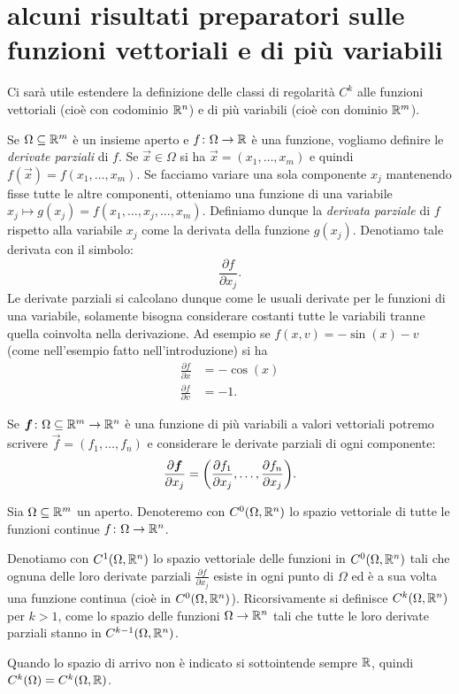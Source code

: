 \section[funzioni vettoriali e di più variabili]{alcuni risultati preparatori
sulle funzioni vettoriali e di più variabili}

Ci sarà utile estendere la definizione delle classi di regolarità $C^k$ alle
funzioni vettoriali (cioè con codominio $\mathbb R^n$) e di più variabili
(cioè con dominio $\mathbb R^m$).

Se $\Omega\subseteq \mathbb R^m$ è un insieme aperto e $f\colon \Omega \to \mathbb R$
è una funzione, vogliamo definire le \emph{derivate parziali} di $f$.
Se $\vec x \in \Omega$ si ha $\vec x = (x_1,\dots, x_m)$ e quindi
$f(\vec x) = f(x_1,\dots, x_m)$. Se facciamo variare una sola componente
$x_j$ mantenendo fisse tutte le altre componenti, otteniamo una funzione
di una variabile $x_j \mapsto g(x_j) = f(x_1,\dots, x_j, \dots, x_m)$.
Definiamo dunque la \emph{derivata parziale}
di $f$ rispetto alla variabile $x_j$ come la derivata della funzione $g(x_j)$.
Denotiamo tale derivata con il simbolo:
\[
  \frac{\partial f}{\partial x_j}.
\]
Le derivate parziali si calcolano dunque come le usuali derivate per le
funzioni di una variabile, solamente bisogna considerare costanti tutte
le variabili tranne quella coinvolta nella derivazione.
Ad esempio se $f(x,v) = -\sin(x) - v$
(come nell'esempio fatto nell'introduzione) si ha
\begin{align*}
  \frac{\partial f}{\partial x} &= -\cos(x)\\
  \frac{\partial f}{\partial v} &= -1.
\end{align*}

Se $\boldsymbol f\colon \Omega \subseteq \mathbb R^m \to \mathbb R^n$ è una funzione di più
variabili a valori vettoriali potremo scrivere $\vec f = (f_1, \dots, f_n)$
e considerare le derivate parziali di ogni componente:
\[
  \frac{\partial \boldsymbol f}{\partial x_j}
  = {\left( \frac{\partial f_1}{\partial x_j}, \dots, \frac{\partial f_n}{\partial x_j} \right)}.
\]

\begin{definition}
Sia $\Omega\subseteq \mathbb R^m$ un aperto. Denoteremo con $C^0(\Omega,\mathbb R^n)$
lo spazio vettoriale di tutte le funzioni
continue $f\colon \Omega \to \mathbb R^n$.

Denotiamo con $C^1(\Omega,\mathbb R^n)$ lo spazio vettoriale
delle funzioni in $C^0(\Omega,\mathbb R^n)$ tali che ognuna delle loro derivate
parziali $\frac{\partial f}{\partial x_j}$ esiste in ogni punto di $\Omega$ ed
è a sua volta una funzione continua (cioè in $C^0(\Omega,\mathbb R^n)$).
Ricorsivamente si definisce $C^k(\Omega,\mathbb R^n)$ per $k>1$,
come lo spazio delle funzioni $\Omega\to\mathbb R^n$ tali che tutte le loro derivate
parziali stanno in $C^{k-1}(\Omega,\mathbb R^n)$.

Quando lo spazio di arrivo non è indicato si sottointende sempre $\mathbb R$, quindi
$C^k(\Omega) = C^k(\Omega,\mathbb R)$.
\end{definition}

